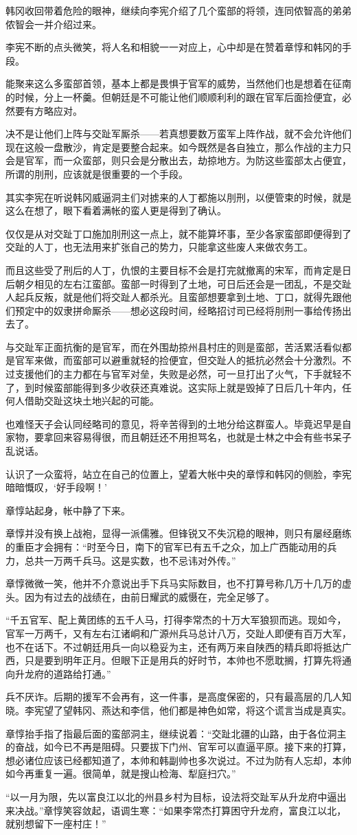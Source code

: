 韩冈收回带着危险的眼神，继续向李宪介绍了几个蛮部的将领，连同侬智高的弟弟侬智会一并介绍过来。

李宪不断的点头微笑，将人名和相貌一一对应上，心中却是在赞着章惇和韩冈的手段。

能聚来这么多蛮部首领，基本上都是畏惧于官军的威势，当然他们也是想着在征南的时候，分上一杯羹。但朝廷是不可能让他们顺顺利利的跟在官军后面捡便宜，必然要有方略应对。

决不是让他们上阵与交趾军厮杀——若真想要数万蛮军上阵作战，就不会允许他们现在这般一盘散沙，肯定是要整合起来。如今既然是各自独立，那么作战的主力只会是官军，而一众蛮部，则只会是分散出去，劫掠地方。为防这些蛮部太占便宜，所谓的刖刑，应该就是很重要的一个手段。

其实李宪在听说韩冈威逼洞主们对掳来的人丁都施以刖刑，以便管束的时候，就是这么在想了，眼下看着满帐的蛮人更是得到了确认。

仅仅是从对交趾丁口施加刖刑这一点上，就不能算坏事，至少各家蛮部即便得到了交趾的人丁，也无法用来扩张自己的势力，只能拿这些废人来做农务工。

而且这些受了刑后的人丁，仇恨的主要目标不会是打完就撤离的宋军，而肯定是日后朝夕相见的左右江蛮部。蛮部一时得到了土地，可日后还会是一团乱，不是交趾人起兵反叛，就是他们将交趾人都杀光。且蛮部想要拿到土地、丁口，就得先跟他们预定中的奴隶拼命厮杀——想必这段时间，经略招讨司已经将刖刑一事给传扬出去了。

与交趾军正面抗衡的是官军，而在外围劫掠州县村庄的则是蛮部，苦活累活看似都是官军来做，而蛮部可以避重就轻的捡便宜，但交趾人的抵抗必然会十分激烈。不过支援他们的主力都在与官军对垒，失败是必然，可一旦打出了火气，下手就轻不了，到时候蛮部能得到多少收获还真难说。这实际上就是毁掉了日后几十年内，任何人借助交趾这块土地兴起的可能。

也难怪天子会认同经略司的意见，将辛苦得到的土地分给这群蛮人。毕竟迟早是自家物，要拿回来容易得很，而且朝廷还不用担骂名，也就是士林之中会有些书呆子乱说话。

认识了一众蛮将，站立在自己的位置上，望着大帐中央的章惇和韩冈的侧脸，李宪暗暗慨叹，‘好手段啊！’

章惇站起身，帐中静了下来。

章惇并没有换上战袍，显得一派儒雅。但锋锐又不失沉稳的眼神，则只有屡经磨练的重臣才会拥有：“时至今日，南下的官军已有五千之众，加上广西能动用的兵力，总共一万两千兵马。这是实数，也不忌讳对外传。”

章惇微微一笑，他并不介意说出手下兵马实际数目，也不打算号称几万十几万的虚头。因为有过去的战绩在，由前日耀武的威慑在，完全足够了。

“千五官军、配上黄团练的五千人马，打得李常杰的十万大军狼狈而逃。现如今，官军一万两千，又有左右江诸峒和广源州兵马总计八万，交趾人即便有百万大军，也不在话下。不过朝廷用兵一向以稳妥为主，还有两万来自陕西的精兵即将抵达广西，只是要到明年正月。但眼下正是用兵的好时节，本帅也不愿耽搁，打算先将通向升龙府的道路给打通。”

兵不厌诈。后期的援军不会再有，这一件事，是高度保密的，只有最高层的几人知晓。李宪望了望韩冈、燕达和李信，他们都是神色如常，将这个谎言当成是真实。

章惇抬手指了指最后面的蛮部洞主，继续说着：“交趾北疆的山路，由于各位洞主的奋战，如今已不再是阻碍。只要拔下门州、官军可以直逼平原。接下来的打算，想必诸位应该已经都知道了，本帅和韩副帅也多次说过。不过为防有人忘却，本帅如今再重复一遍。很简单，就是搜山检海、犁庭扫穴。”

“以一月为限，先以富良江以北的州县乡村为目标，设法将交趾军从升龙府中逼出来决战。”章惇笑容敛起，语调生寒：“如果李常杰打算困守升龙府，富良江以北，就别想留下一座村庄！”

